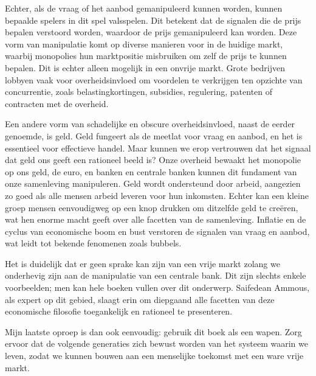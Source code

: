 Echter, als de vraag of het aanbod gemanipuleerd kunnen worden, kunnen bepaalde spelers in dit spel valsspelen. Dit betekent dat de signalen die de prijs bepalen verstoord worden, waardoor de prijs gemanipuleerd kan worden. Deze vorm van manipulatie komt op diverse manieren voor in de huidige markt, waarbij monopolies hun marktpositie misbruiken om zelf de prijs te kunnen bepalen. Dit is echter alleen mogelijk in een onvrije markt. Grote bedrijven lobbyen vaak voor overheidsinvloed om voordelen te verkrijgen ten opzichte van concurrentie, zoals belastingkortingen, subsidies, regulering, patenten of contracten met de overheid.

Een andere vorm van schadelijke en obscure overheidsinvloed, naast de eerder genoemde, is geld. Geld fungeert als de meetlat voor vraag en aanbod, en het is essentieel voor effectieve handel. Maar kunnen we erop vertrouwen dat het signaal dat geld ons geeft een rationeel beeld is? Onze overheid bewaakt het monopolie op ons geld, de euro, en banken en centrale banken kunnen dit fundament van onze samenleving manipuleren. Geld wordt ondersteund door arbeid, aangezien zo goed als alle mensen arbeid leveren voor hun inkomsten. Echter kan een kleine groep mensen eenvoudigweg op een knop drukken om ditzelfde geld te creëren, wat hen enorme macht geeft over alle facetten van de samenleving. Inflatie en de cyclus van economische boom en bust verstoren de signalen van vraag en aanbod, wat leidt tot bekende fenomenen zoals bubbels.

Het is duidelijk dat er geen sprake kan zijn van een vrije markt zolang we onderhevig zijn aan de manipulatie van een centrale bank. Dit zijn slechts enkele voorbeelden; men kan hele boeken vullen over dit onderwerp. Saifedean Ammous, als expert op dit gebied, slaagt erin om diepgaand alle facetten van deze economische filosofie toegankelijk en rationeel te presenteren.

Mijn laatste oproep is dan ook eenvoudig: gebruik dit boek als een wapen. Zorg ervoor dat de volgende generaties zich bewust worden van het systeem waarin we leven, zodat we kunnen bouwen aan een menselijke toekomst met een ware vrije markt.


